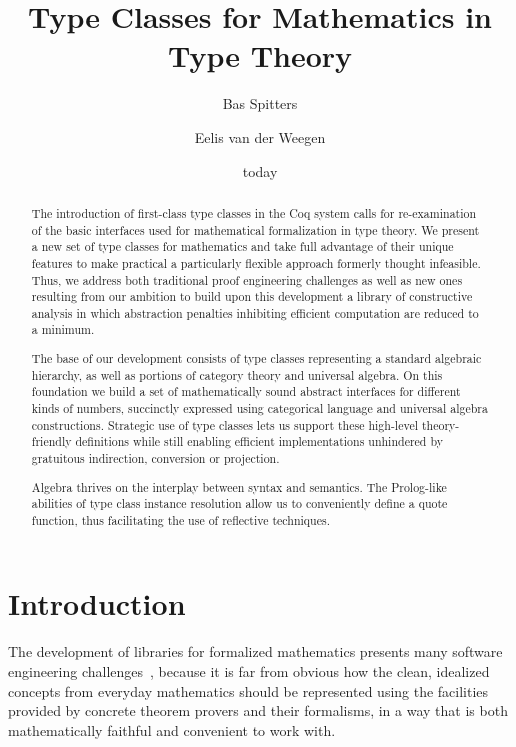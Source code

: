 \documentclass[a4paper,10pt,runningheads]{llncs}
\begin{document}
\title{Type Classes for Mathematics in Type Theory}
\author{Bas Spitters \and Eelis van der Weegen} %
\date{today}
\maketitle
\begin{abstract}
The introduction of first-class type classes in the Coq system calls for re-examination of the basic interfaces used for mathematical formalization in type theory.
We present a new set of type classes for mathematics and take full advantage of their unique features to make practical a particularly flexible approach formerly thought infeasible. Thus, we address both traditional proof engineering challenges as well as new ones resulting from our ambition to build upon this development a library of constructive analysis in which abstraction penalties inhibiting efficient computation are reduced to a minimum.

The base of our development consists of type classes representing a standard algebraic hierarchy, as well as portions of category theory and universal algebra. On this foundation we build a set of mathematically sound abstract interfaces for different kinds of numbers, succinctly expressed using categorical language and universal algebra constructions. Strategic use of type classes lets us support these high-level theory-friendly definitions while still enabling efficient implementations unhindered by gratuitous indirection, conversion or projection.

Algebra thrives on the interplay between syntax and semantics. The Prolog-like abilities of type class instance resolution allow us to conveniently define a quote function, thus facilitating the use of reflective techniques.
\end{abstract}

\section{Introduction}
The development of libraries for formalized mathematics presents many software engineering challenges~\cite{C-corn,DBLP:conf/types/HaftmannW08}, because it is far from obvious how the clean, idealized concepts from everyday mathematics should be represented using the facilities provided by concrete theorem provers and their formalisms, in a way that is both mathematically faithful and convenient to work with.
\end{document}

